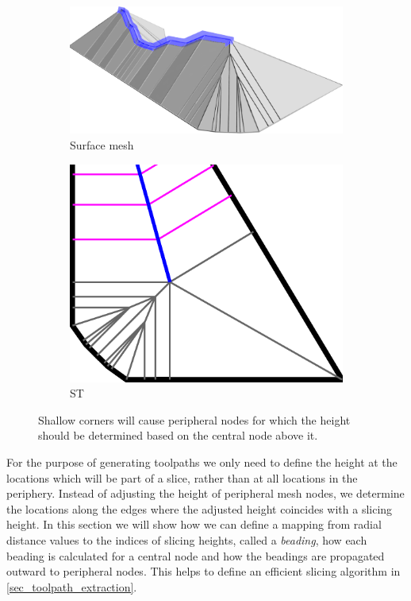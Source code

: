 \begin{figure}\centering
\setlength{\figheight}{.2\columnwidth}
\begin{subfigure}{.55\columnwidth}\centering
\includegraphics[height=\figheight]{sources/method/peripheral_heights_3D.png}
\caption{Surface mesh}
\end{subfigure}
\begin{subfigure}{.4\columnwidth}\centering
\includegraphics[height=\figheight]{sources/method/peripheral_heights.pdf}
\caption{ST}
\end{subfigure}
\caption{
Shallow corners will cause peripheral nodes for which the height should be determined based on the central node above it.
}
\label{peripheral_heights}
\end{figure}



For the purpose of generating toolpaths we only need to define the height at the locations which will be part of a slice, rather than at all locations in the periphery.
Instead of adjusting the height of peripheral mesh nodes, we determine the locations along the edges where the adjusted height coincides with a slicing height.
In this section we will show how we can define a mapping from radial distance values to the indices of slicing heights, called a \emph{beading},
how each beading is calculated for a central node
and how the beadings are propagated outward to peripheral nodes.
This helps to define an efficient slicing algorithm in \cref{sec_toolpath_extraction}.

